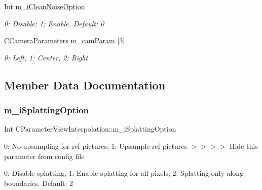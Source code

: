 \begin{DoxyCompactItemize}
\mbox{\label{class_c_parameter_view_interpolation_a38019d0877f3211deb6bd9cef9b91d26}} 
Int \hyperlink{class_c_parameter_view_interpolation_a38019d0877f3211deb6bd9cef9b91d26}{m\+\_\+i\+Clean\+Noise\+Option}
\begin{DoxyCompactList}\small\item\em 0\+: Disable; 1; Enable. Default\+: 0 \end{DoxyCompactList}\item 
\mbox{\label{class_c_parameter_view_interpolation_ac81296edf7c585d53ab8b5849ef1c60f}} 
\hyperlink{class_c_camera_parameters}{C\+Camera\+Parameters} \hyperlink{class_c_parameter_view_interpolation_ac81296edf7c585d53ab8b5849ef1c60f}{m\+\_\+cam\+Param} \mbox{[}3\mbox{]}
\begin{DoxyCompactList}\small\item\em 0\+: Left, 1\+: Center, 2\+: Right \end{DoxyCompactList}\end{DoxyCompactItemize}


\subsection{Member Data Documentation}
\mbox{\label{class_c_parameter_view_interpolation_a3ff171b45e1997dc6f76db0d40c46be7}} 
\subsubsection{\texorpdfstring{m\+\_\+i\+Splatting\+Option}{m\_iSplattingOption}}
{\footnotesize\ttfamily Int C\+Parameter\+View\+Interpolation\+::m\+\_\+i\+Splatting\+Option\hspace{0.3cm}{\ttfamily [protected]}}



0\+: No upsampling for ref pictures; 1\+: Upsample ref pictures $>$$>$$>$$>$ Hide this parameter from config file 

0\+: Disable splatting; 1\+: Enable splatting for all pixels; 2\+: Splatting only along boundaries. Default\+: 2 \mbox{\label{class_c_parameter_view_interpolation_ad129c82c944146c2433758a88671acef}} 
